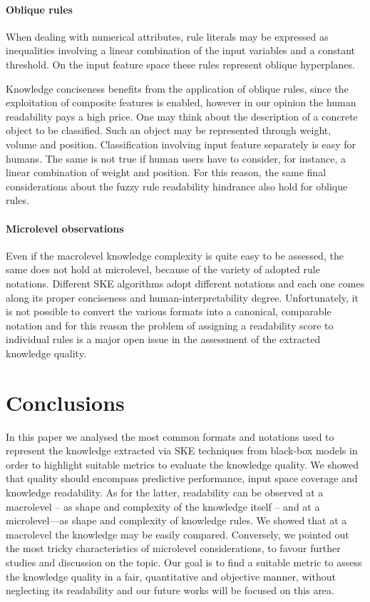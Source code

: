\documentclass[sigconf]{acmart}
\begin{document}
\paragraph{Oblique rules}

When dealing with numerical attributes, rule literals may be expressed as inequalities involving a linear combination of the input variables and a constant threshold.
%
On the input feature space these rules represent oblique hyperplanes.

Knowledge conciseness benefits from the application of oblique rules, since the exploitation of composite features is enabled, however in our opinion the human readability pays a high price.
%
One may think about the description of a concrete object to be classified.
%
Such an object may be represented through weight, volume and position.
%
Classification involving input feature separately is easy for humans.
%
The same is not true if human users have to consider, for instance, a linear combination of weight and position.
%
For this reason, the same final considerations about the fuzzy rule readability hindrance also hold for oblique rules.

\paragraph{Microlevel observations}

Even if the macrolevel knowledge complexity is quite easy to be assessed, the same does not hold at microlevel, because of the variety of adopted rule notations.
%
Different SKE algorithms adopt different notations and each one comes along its proper conciseness and human-interpretability degree.
%
Unfortunately, it is not possible to convert the various formats into a canonical, comparable notation and for this reason the problem of assigning a readability score to individual rules is a major open issue in the assessment of the extracted knowledge quality.

\section{Conclusions}

In this paper we analysed the most common formats and notations used to represent the knowledge extracted via SKE techniques from black-box models in order to highlight suitable metrics to evaluate the knowledge quality.
%
We showed that quality should encompass predictive performance, input space coverage and knowledge readability.
%
As for the latter, readability can be observed at a macrolevel -- as shape and complexity of the knowledge itself -- and at a microlevel---as shape and complexity of knowledge rules.
%
We showed that at a macrolevel the knowledge may be easily compared.
%
Conversely, we pointed out the most tricky characteristics of microlevel considerations, to favour further studies and discussion on the topic.
%
Our goal is to find a suitable metric to assess the knowledge quality in a fair, quantitative and objective manner, without neglecting its readability and our future works will be focused on this area.
\end{document}
